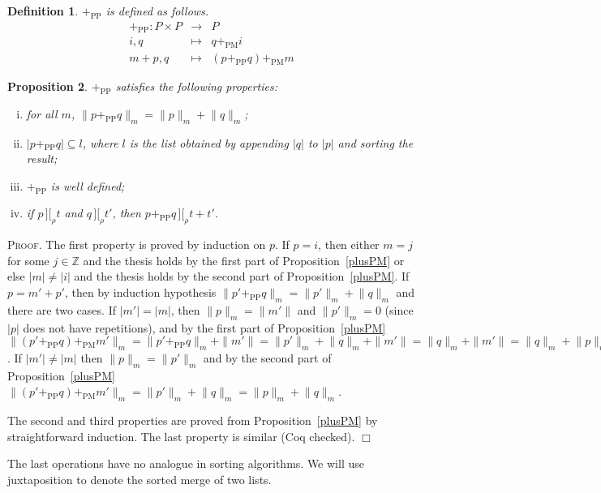 \documentclass{article}
\newtheorem{definition}{Definition}[section]
\newtheorem{proposition}[definition]{Proposition}
\newenvironment{proof}{\smallskip\textsc{Proof.}}{\hspace*{\fill}$\Box$}
\newcommand{\intII}{\,]\![}
\newcommand{\intrel}{\mathbin{\intII_{\rho}}}
\newcommand{\Z}{{\mathbb Z}}
\newcommand{\coeff}[2]{\ensuremath{\|#2\|_{#1}}}
\newcommand{\plusPM}{\ensuremath{+_{\mathrm{PM}}}}
\newcommand{\plusPP}{\ensuremath{+_{\mathrm{PP}}}}
\begin{document}
\begin{definition}\label{defn:plusPP} {\plusPP} is defined as follows.
\begin{eqnarray*}
\plusPP : P\times P & \to & P \\
 i, q & \mapsto & q\plusPM i \\
 m+p, q & \mapsto & (p\plusPP q)\plusPM m
\end{eqnarray*}
\end{definition}

\begin{proposition}\label{plusPP}
{\plusPP} satisfies the following properties:
\begin{enumerate}[(i)]
\item for all $m$, $\coeff m{p\plusPP q}=\coeff mp+\coeff mq$;
\item $|p\plusPP q|\subseteq l$, where $l$ is the list obtained by appending
$|q|$ to $|p|$ and sorting the result;
\item {\plusPP} is well defined;
\item if $p\intrel t$ and $q\intrel t'$, then $p\plusPP q\intrel t+t'$.
\end{enumerate}
\end{proposition}
\begin{proof}
The first property is proved by induction on $p$.  If $p=i$, then
either $m=j$ for some $j\in\Z$ and the thesis holds by the first part
of Proposition~\ref{plusPM} or else $|m|\neq|i|$ and the thesis holds
by the second part of Proposition~\ref{plusPM}.  If $p=m'+p'$, then
by induction hypothesis $\coeff m{p'\plusPP q}=\coeff m{p'}+\coeff mq$
and there are two cases.  If $|m'|=|m|$, then $\coeff mp=\|m'\|$ and
$\coeff m{p'}=0$ (since $|p|$ does not have repetitions), and by the
first part of Proposition~\ref{plusPM}
$\coeff m{(p'\plusPP q)\plusPM m'}%
=\coeff m{p'\plusPP q}+\|m'\|%
=\coeff m{p'}+\coeff mq+\|m'\|%
=\coeff mq+\|m'\|%
=\coeff mq+\coeff mp$.
If $|m'|\neq|m|$ then $\coeff mp=\coeff m{p'}$ and by the second part
of Proposition~\ref{plusPM}
$\coeff m{(p'\plusPP q)\plusPM m'}%
=\coeff m{p'}+\coeff mq=%
\coeff mp+\coeff mq$.

The second and third properties are proved from
Proposition~\ref{plusPM} by straightforward induction.  The last
property is similar (Coq checked).
\end{proof}

\bigskip

The last operations have no analogue in sorting algorithms.
We will use juxtaposition to denote the sorted merge of two lists.
\end{document}
